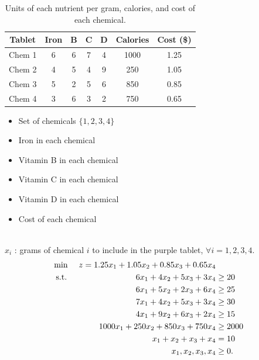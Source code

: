 \begin{table}[h!] \begin{center} \begin{tabular} {|c|c|c|c|c|c|c|}
\hline Tablet  & Iron  &  B &  C &  D & Calories & Cost (\$) \\ \hline
\hline  Chem 1  & 6    & 6         & 7         & 4         &  1000    & 1.25 \\
\hline  Chem 2  & 4    & 5         & 4         & 9         &  250     & 1.05 \\
\hline  Chem 3  & 5    & 2         & 5         & 6         &  850     & 0.85 \\
\hline  Chem 4  & 3    & 6         & 3         & 2         &  750     & 0.65 \\
\hline
\end{tabular} \end{center} \caption{Units of each nutrient per gram, calories, and cost of each chemical.}\label{tab:modeling-linear-programming-tab02}%
\end{table}

\begin{solution}

\smallskip {}
\begin{itemize}
\item Set of chemicals $\{1,2,3,4\}$
\end{itemize}
\smallskip {}
\begin{itemize}
\item Iron in each chemical
\item Vitamin B in each chemical
\item Vitamin C in each chemical
\item Vitamin D in each chemical
\item Cost of each chemical
\end{itemize}
\smallskip {} \\
$x_i$ : grams of chemical $i$ to include in the purple tablet, $\forall i = 1,2,3,4$.\\
\smallskip {}
\begin{align*}
\min\ && z = 1.25x_1 + 1.05x_2 + 0.85x_3 + 0.65x_4 \\
\text{ s.t. } &&  6x_1 + 4x_2 + 5x_3 + 3x_4 &\ge 20 \\
&& 6x_1 + 5x_2 + 2x_3 + 6x_4 &\ge 25  \\
&& 7x_1 + 4x_2 + 5x_3 + 3x_4 &\ge 30  \\
&& 4x_1 + 9x_2 + 6x_3 + 2x_4 &\ge 15  \\
&& 1000x_1 + 250x_2 + 850x_3 + 750x_4 &\ge 2000 \\
&& x_1 + x_2 + x_3 + x_4 &= 10  \\
&& x_1, x_2, x_3, x_4 &\ge 0. 
\end{align*}

\end{solution}

